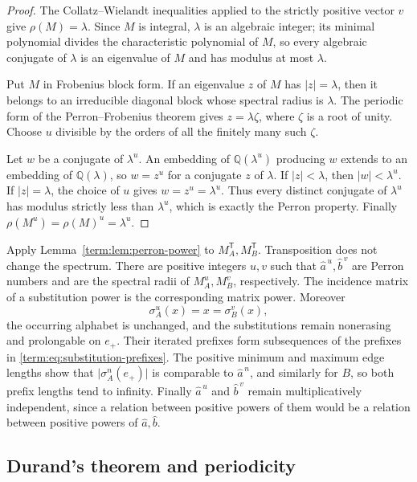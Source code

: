 \documentclass[11pt]{article}
\theoremstyle{definition}
\theoremstyle{remark}
\begin{document}
\begin{proof}
The Collatz--Wielandt inequalities applied to the strictly positive vector
\(v\) give \(\rho(M)=\lambda\).  Since \(M\) is integral, \(\lambda\) is an
algebraic integer; its minimal polynomial divides the characteristic
polynomial of \(M\), so every algebraic conjugate of \(\lambda\) is an
eigenvalue of \(M\) and has modulus at most \(\lambda\).

Put \(M\) in Frobenius block form.  If an eigenvalue \(z\) of \(M\) has
\(|z|=\lambda\), then it belongs to an irreducible diagonal block whose
spectral radius is \(\lambda\).  The periodic form of the Perron--Frobenius
theorem gives \(z=\lambda\zeta\), where \(\zeta\) is a root of unity.  Choose
\(u\) divisible by the orders of all the finitely many such \(\zeta\).

Let \(w\) be a conjugate of \(\lambda^u\).  An embedding of
\(\mathbb Q(\lambda^u)\) producing \(w\) extends to an embedding of
\(\mathbb Q(\lambda)\), so \(w=z^u\) for a conjugate \(z\) of \(\lambda\).
If \(|z|<\lambda\), then \(|w|<\lambda^u\).  If \(|z|=\lambda\), the
choice of \(u\) gives \(w=z^u=\lambda^u\).  Thus every distinct conjugate of
\(\lambda^u\) has modulus strictly less than \(\lambda^u\), which is exactly
the Perron property.  Finally
\(\rho(M^u)=\rho(M)^u=\lambda^u\).
\end{proof}

Apply Lemma~\ref{term:lem:perron-power} to
$M_A^{\mathsf T},M_B^{\mathsf T}$.  Transposition does not change the
spectrum.  There are positive integers $u,v$ such that
$\widehat a^{\,u},\widehat b^{\,v}$ are Perron numbers and are the spectral
radii of $M_A^u,M_B^v$, respectively.  The incidence matrix of a substitution
power is the corresponding matrix power.
Moreover
\[
 \sigma_A^u(x)=x=\sigma_B^v(x),
\]
the occurring alphabet is unchanged, and the substitutions remain
nonerasing and prolongable on \(e_+\).  Their iterated prefixes form
subsequences of the prefixes in \eqref{term:eq:substitution-prefixes}.  The
positive minimum and maximum edge lengths show that
\(\lvert\sigma_A^n(e_+)\rvert\) is comparable to \(\widehat a^{\,n}\), and
similarly for \(B\), so both prefix lengths tend to infinity.  Finally
\(\widehat a^{\,u}\) and \(\widehat b^{\,v}\) remain multiplicatively
independent, since a relation between positive powers of them would be a
relation between positive powers of \(\widehat a,\widehat b\).

\subsection{Durand's theorem and periodicity}
\end{document}
